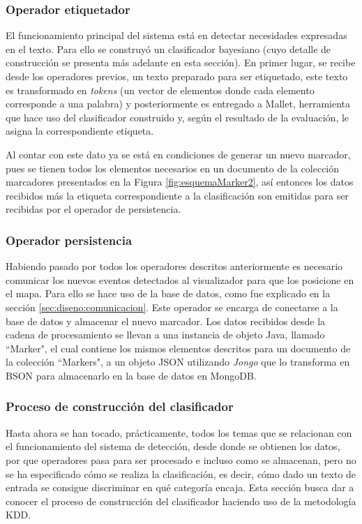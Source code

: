 \subsubsection*{Operador etiquetador}
\label{subsubsec:7op}

El funcionamiento principal del sistema está en detectar necesidades expresadas en el texto. Para ello se construyó un clasificador bayesiano (cuyo detalle de construcción se presenta más adelante en esta sección). En primer lugar, se recibe desde los operadores previos, un texto preparado para ser etiquetado, este texto es transformado en \textit{tokens} (un vector de elementos donde cada elemento corresponde a una palabra) y posteriormente es entregado a Mallet, herramienta que hace uso del clasificador construido y, según el resultado de la evaluación, le asigna la correspondiente etiqueta. 

Al contar con este dato ya se está en condiciones de generar un nuevo marcador, pues se tienen todos los elementos necesarios en un documento de la colección marcadores presentados en la Figura \ref{fig:esquemaMarker2}, así entonces los datos recibidos más la etiqueta correspondiente a la clasificación son emitidas para ser recibidas por el operador de persistencia.

\subsubsection*{Operador persistencia}
\label{subsubsec:8op}

Habiendo pasado por todos los operadores descritos anteriormente es necesario comunicar los nuevos eventos detectados al visualizador para que los posicione en el mapa. Para ello se hace uso de la base de datos, como fue explicado en la sección \ref{sec:diseno:comunicacion}.
Este operador se encarga de conectarse a la base de datos y almacenar el nuevo marcador. Los datos recibidos desde la cadena de procesamiento se llevan a una instancia de objeto Java, llamado ``Marker", el cual contiene los mismos elementos descritos para un documento de la colección ``Markers", a un objeto JSON utilizando \textit{Jongo} que lo transforma en BSON para almacenarlo en la base de datos en MongoDB.

\subsubsection*{Proceso de construcción del clasificador}
\label{subsubsec:clasificacion}

Hasta ahora se han tocado, prácticamente, todos los temas que se relacionan con el funcionamiento del sistema de detección, desde donde se obtienen los datos, por que operadores pasa para ser procesado e incluso como se almacenan, pero no se ha especificado cómo se realiza la clasificación, es decir, cómo dado un texto de entrada se consigue discriminar en qué categoría encaja. Esta sección busca dar a conocer el proceso de construcción del clasificador haciendo uso de la metodología KDD.
	
